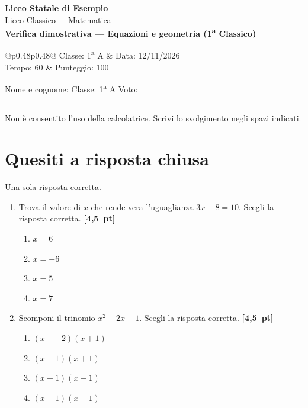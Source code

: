 \documentclass[11pt,a4paper]{article}
\makeatletter
\newcommand{\punti}[1]{\hfill\textbf{[#1~pt]}}
\newcommand{\intestazione}[8]{%
  \begin{center}
    {\large\bfseries #1}\\[1mm]
    {\small #2\ --\ #3}\\[3mm]
    {\Large\bfseries #4}\\[3mm]
    \begin{tabular}{@{}p{0.48\textwidth}p{0.48\textwidth}@{}}
      Classe: #5 & Data: #6 \\
      Tempo: #7 & Punteggio: #8 \\
    \end{tabular}
  \end{center}
}
\newcommand{\titolosezione}[1]{\par\needspace{4\baselineskip}\section*{#1}\vspace{-1mm}}
\makeatother
\begin{document}

\intestazione{Liceo Statale di Esempio}{Liceo Classico}{Matematica}{Verifica dimostrativa --- Equazioni e geometria (1\textsuperscript{a} Classico)}{1\textsuperscript{a} A}{12/11/2026}{60}{100}




\noindent Nome e cognome: \dotfill \hfill Classe: 1\textsuperscript{a} A \hfill Voto: \dotfill
\par\vspace{1mm}
\noindent\rule{\linewidth}{0.4pt}
\par\vspace{1mm}

\noindent\small Non è consentito l'uso della calcolatrice. Scrivi lo svolgimento negli spazi indicati.\par\vspace{2mm}



\titolosezione{Quesiti a risposta chiusa}

\noindent\small Una sola risposta corretta.\par\vspace{1mm}

\begin{enumerate}[label=\arabic*),start=1]
\item Trova il valore di $x$ che rende vera l'uguaglianza $3x - 8 = 10$. Scegli la risposta corretta. \punti{4,5}
\begin{enumerate}[label=\Alph*),itemsep=1pt,topsep=2pt,leftmargin=7mm]

  \item $x = 6$

  \item $x = -6$

  \item $x = 5$

  \item $x = 7$

\end{enumerate}

\item Scomponi il trinomio $x^2 + 2x + 1$. Scegli la risposta corretta. \punti{4,5}
\begin{enumerate}[label=\Alph*),itemsep=1pt,topsep=2pt,leftmargin=7mm]

  \item $(x + -2)(x + 1)$

  \item $(x + 1)(x + 1)$

  \item $(x - 1)(x - 1)$

  \item $(x + 1)(x - 1)$

\end{enumerate}

\end{enumerate}
\end{document}

